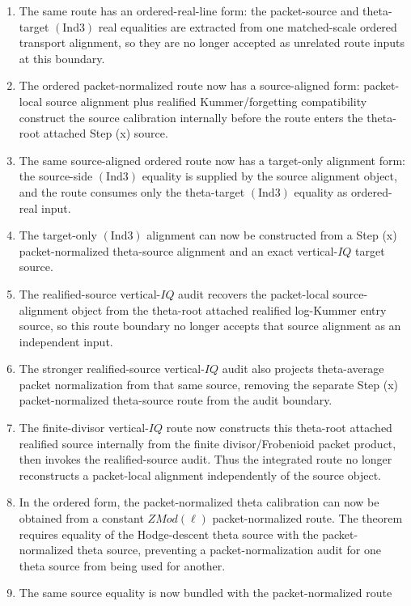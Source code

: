 \documentclass[11pt]{article}
\newcommand{\Ind}{\ensuremath{\mathrm{Ind}}}
\theoremstyle{plain}
\theoremstyle{definition}
\theoremstyle{remark}
\begin{document}
\begin{enumerate}
  from a named packet-local source-alignment object and exact vertical-\(IQ\)
  target, then concludes the current \(C_\Theta\) dichotomy.
\item The same route has an ordered-real-line form: the packet-source and
  theta-target \((\Ind3)\) real equalities are extracted from one matched-scale
  ordered transport alignment, so they are no longer accepted as unrelated
  route inputs at this boundary.
\item The ordered packet-normalized route now has a source-aligned form:
  packet-local source alignment plus realified Kummer/forgetting compatibility
  construct the source calibration internally before the route enters the
  theta-root attached Step (x) source.
\item The same source-aligned ordered route now has a target-only alignment
  form: the source-side \((\Ind3)\) equality is supplied by the source
  alignment object, and the route consumes only the theta-target
  \((\Ind3)\) equality as ordered-real input.
\item The target-only \((\Ind3)\) alignment can now be constructed from a
  Step (x) packet-normalized theta-source alignment and an exact
  vertical-\(IQ\) target source.
\item The realified-source vertical-\(IQ\) audit recovers the packet-local
  source-alignment object from the theta-root attached realified
  log-Kummer entry source, so this route boundary no longer accepts that
  source alignment as an independent input.
\item The stronger realified-source vertical-\(IQ\) audit also projects
  theta-average packet normalization from that same source, removing the
  separate Step (x) packet-normalized theta-source route from the audit
  boundary.
\item The finite-divisor vertical-\(IQ\) route now constructs this theta-root
  attached realified source internally from the finite divisor/Frobenioid
  packet product, then invokes the realified-source audit.  Thus the integrated
  route no longer reconstructs a packet-local alignment independently of the
  source object.
\item In the ordered form, the packet-normalized theta calibration can now be
  obtained from a constant \(ZMod(\ell)\) packet-normalized route.  The theorem
  requires equality of the Hodge-descent theta source with the packet-normalized
  theta source, preventing a packet-normalization audit for one theta source
  from being used for another.
\item The same source equality is now bundled with the packet-normalized route

\end{enumerate}
\end{document}

